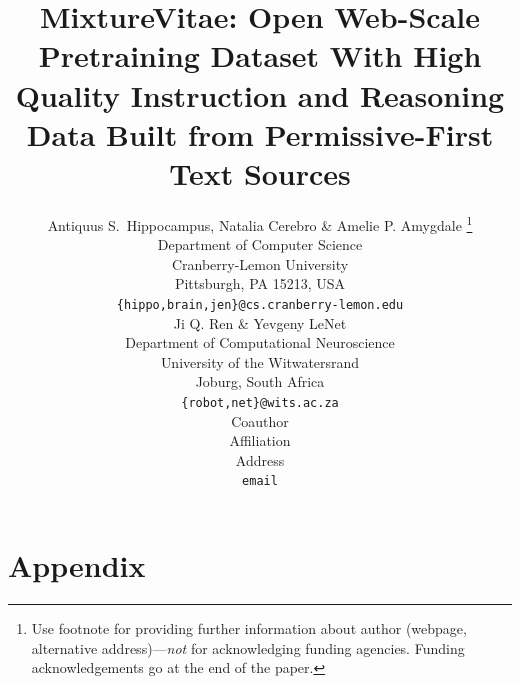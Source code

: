 \documentclass{article} %
\title{MixtureVitae: Open Web-Scale Pretraining Dataset With High Quality Instruction and Reasoning Data Built from Permissive-First Text Sources}
\author{Antiquus S.~Hippocampus, Natalia Cerebro \& Amelie P. Amygdale \thanks{ Use footnote for providing further information
about author (webpage, alternative address)---\emph{not} for acknowledging
funding agencies.  Funding acknowledgements go at the end of the paper.} \\
Department of Computer Science\\
Cranberry-Lemon University\\
Pittsburgh, PA 15213, USA \\
\texttt{\{hippo,brain,jen\}@cs.cranberry-lemon.edu} \\
\And
Ji Q. Ren \& Yevgeny LeNet \\
Department of Computational Neuroscience \\
University of the Witwatersrand \\
Joburg, South Africa \\
\texttt{\{robot,net\}@wits.ac.za} \\
\AND
Coauthor \\
Affiliation \\
Address \\
\texttt{email}
}
\begin{document}
\maketitle

\begin{abstract}

\end{abstract}












\appendix
\section{Appendix}













\end{document}
